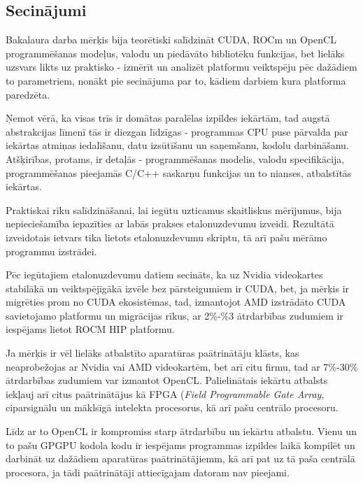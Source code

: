 \begin{center}
    \chapter{Secinājumi}
\end{center}

Bakalaura darba mērķis bija teorētiski salīdzināt CUDA, ROCm un OpenCL
programmēšanas modeļus, valodu un piedāvāto bibliotēku funkcijas, bet lielāks
uzsvars likts uz  praktisko - izmērīt un analizēt platformu veiktspēju pēc
dažādiem to parametriem, nonākt pie secinājuma par to, kādiem darbiem kura
platforma paredzēta.

Ņemot vērā, ka visas trīs ir domātas paralēlas izpildes iekārtām, tad augstā
abstrakcijas līmenī tās ir diezgan līdzīgas - programmas CPU puse pārvalda par
iekārtas atmiņas iedalīšanu, datu izsūtīšanu un saņemšanu, kodolu darbināšanu.
Atšķirības, protams, ir detaļās - programmēšanas modelis, valodu specifikācija,
programmēšanas pieejamās C/C++ saskarņu funkcijas un to nianses, atbalstītās
iekārtas.

Praktiskai rīku salīdzināšanai, lai iegūtu uzticamus skaitliskus mērījumus, 
bija nepieciešamība iepazīties ar labās prakses etalonuzdevumu izveidi.
Rezultātā izveidotais ietvars tika lietots etalonuzdevumu skriptu, tā arī pašu
mērāmo programmu izstrādei.

Pēc iegūtajiem etalonuzdevumu datiem secināts, ka uz Nvidia videokartes
stabilākā un veiktspējīgākā izvēle bez pārsteigumiem ir CUDA, bet, ja mērķis ir
migrēties prom no CUDA ekosistēmas, tad, izmantojot AMD izstrādāto CUDA
savietojamo platformu un migrācijas rīkus, ar 2\%-\%3 ātrdarbības zudumiem ir
iespējams lietot ROCM HIP platformu.

Ja mērķis ir vēl lielāks atbalstīto aparatūras paātrinātāju klāsts, kas
neaprobežojas ar Nvidia vai AMD videokartēm, bet arī citu firmu, tad ar
7\%-30\% ātrdarbības zudumiem var izmantot OpenCL. Palielinātais iekārtu
atbalsts iekļauj arī citus paātrinātājus kā FPGA (\textit{Field Programmable
Gate Array}, ciparsignālu un māklsīgā intelekta procesorus, kā arī pašu
centrālo procesoru.

Līdz ar to OpenCL ir kompromiss starp ātrdarbību un iekārtu atbalstu. Vienu un
to pašu GPGPU kodola kodu ir iespējams programmas izpildes laikā kompilēt un
darbināt uz dažādiem aparatūras paātrinātājiemm, kā arī pat uz tā paša centrālā
procesora, ja tādi paātrinātāji attiecīgajam datoram nav pieejami.

